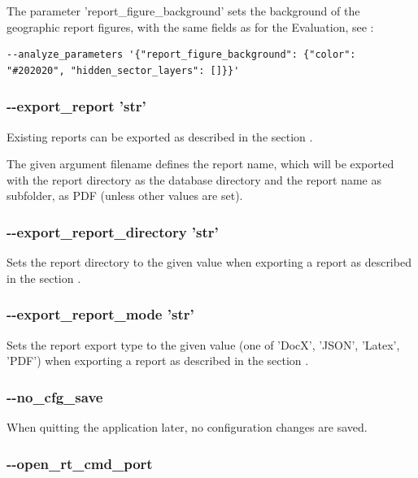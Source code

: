 The parameter 'report\_figure\_background' sets the background of the geographic report figures, with the same fields as for the Evaluation, see :

\begin{lstlisting}[basicstyle=\small\ttfamily]
--analyze_parameters '{"report_figure_background": {"color": "#202020", "hidden_sector_layers": []}}'
\end{lstlisting}


\subsubsection{-{}-export\_report 'str'}

Existing reports can be exported as described in the section .

The given argument filename defines the report name, which will be exported with the report directory as the database directory  and the report name as subfolder, as PDF (unless other values are set).

\subsubsection{-{}-export\_report\_directory 'str'}

Sets the report directory to the given value when exporting a report as described in the section .

\subsubsection{-{}-export\_report\_mode 'str'}

Sets the report export type to the given value (one of 'DocX', 'JSON', 'Latex', 'PDF') when exporting a report as described in the section .

\subsubsection{-{}-no\_cfg\_save}

When quitting the application later, no configuration changes are saved.

\subsubsection{-{}-open\_rt\_cmd\_port}


